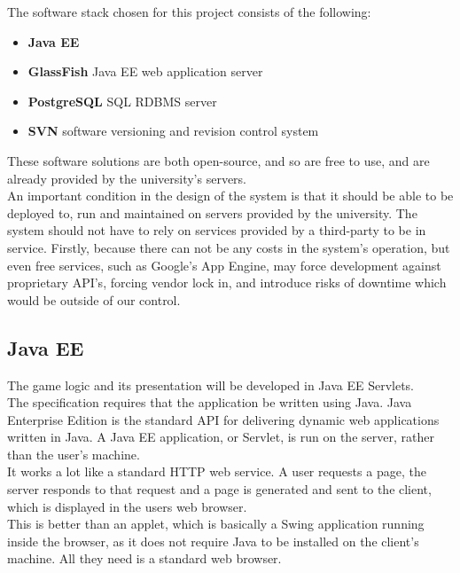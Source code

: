 \documentclass[a4paper]{article}
\begin{document}
The software stack chosen for this project consists of the following:

\begin{itemize}
\item \textbf{Java EE}
\item \textbf{GlassFish} Java EE web application server
\item \textbf{PostgreSQL} SQL RDBMS server
\item \textbf{SVN} software versioning and revision control system
\end{itemize}

These software solutions are both open-source, and so are free to use, and are already provided by the university's servers.\\

An important condition in the design of the system is that it should be able to be deployed to, run and maintained on servers provided by the university. The system should not have to rely on services provided by a third-party to be in service. Firstly, because there can not be any costs in the system's operation, but even free services, such as Google's App Engine, may force development against proprietary API's, forcing vendor lock in, and introduce risks of downtime which would be outside of our control.

\subsection{Java EE}

The game logic and its presentation will be developed in Java EE Servlets.\\

The specification requires that the application be written using Java. Java Enterprise Edition is the standard API for delivering dynamic web applications written in Java. A Java EE application, or Servlet, is run on the server, rather than the user's machine.\\

It works a lot like a standard HTTP web service. A user requests a page, the server responds to that request and a page is generated and sent to the client, which is displayed in the users web browser.\\

This is better than an applet, which is basically a Swing application running inside the browser, as it does not require Java to be installed on the client's machine. All they need is a standard web browser.
\end{document}
